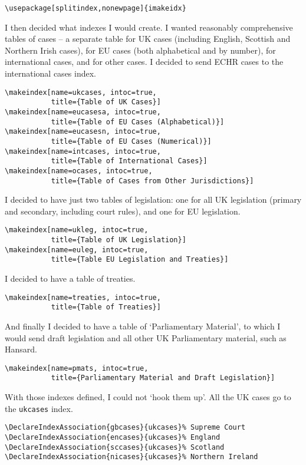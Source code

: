 \documentclass[a5paper,fontsize=9pt,DIV=1]{scrartcl}
\begin{document}
\begin{verbatim}
\usepackage[splitindex,nonewpage]{imakeidx}
\end{verbatim}

I then decided what indexes I would create. I wanted reasonably comprehensive tables of cases -- a separate table for UK cases (including English, Scottish and Northern Irish cases), for EU cases (both alphabetical and by number), for international cases, and for other cases. I decided to send ECHR cases to the international cases index.

\begin{verbatim}
\makeindex[name=ukcases, intoc=true,
           title={Table of UK Cases}]
\makeindex[name=eucasesa, intoc=true,
           title={Table of EU Cases (Alphabetical)}]
\makeindex[name=eucasesn, intoc=true,
           title={Table of EU Cases (Numerical)}]
\makeindex[name=intcases, intoc=true,
           title={Table of International Cases}]
\makeindex[name=ocases, intoc=true,
           title={Table of Cases from Other Jurisdictions}]
\end{verbatim}

I decided to have just two tables of legislation: one for all UK legislation (primary and secondary, including court rules), and one for EU legislation.

\begin{verbatim}
\makeindex[name=ukleg, intoc=true,
           title={Table of UK Legislation}]
\makeindex[name=euleg, intoc=true,
           title={Table EU Legislation and Treaties}]
\end{verbatim}

I decided to have a table of treaties.
\begin{verbatim}
\makeindex[name=treaties, intoc=true,
           title={Table of Treaties}]
\end{verbatim}

And finally I decided to have a table of `Parliamentary Material', to which I would send draft legislation and all other UK Parliamentary material, such as Hansard.

\begin{verbatim}
\makeindex[name=pmats, intoc=true,
           title={Parliamentary Material and Draft Legislation}]
\end{verbatim}

With those indexes defined, I could not `hook them up'. All the UK cases go to the \texttt{ukcases} index.
\begin{verbatim}
\DeclareIndexAssociation{gbcases}{ukcases}% Supreme Court
\DeclareIndexAssociation{encases}{ukcases}% England
\DeclareIndexAssociation{sccases}{ukcases}% Scotland
\DeclareIndexAssociation{nicases}{ukcases}% Northern Ireland
\end{verbatim}
\end{document}
